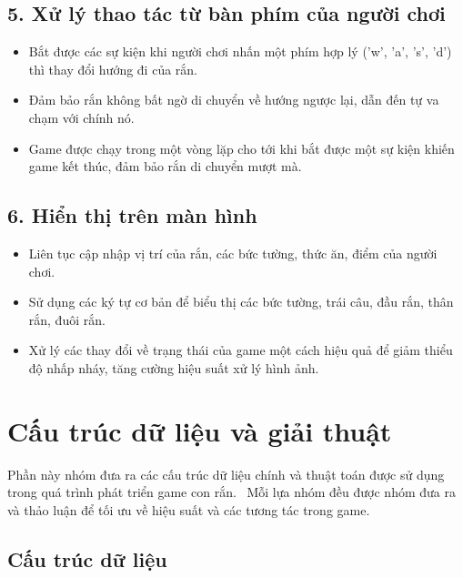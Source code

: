 \documentclass[12pt]{report}
\begin{document}
\subsection*{5. Xử lý thao tác từ bàn phím của người chơi}
\begin{itemize}
    \item Bắt được các sự kiện khi người chơi nhấn một phím hợp lý ('w', 'a', 's', 'd') thì thay đổi hướng đi của rắn.
    \item Đảm bảo rắn không bất ngờ di chuyển về hướng ngược lại, dẫn đến tự va chạm với chính nó.
    \item Game được chạy trong một vòng lặp cho tới khi bắt được một sự kiện khiến game kết thúc, đảm bảo rắn di chuyển mượt mà.
\end{itemize}

\subsection*{6. Hiển thị trên màn hình}
\begin{itemize}
    \item Liên tục cập nhập vị trí của rắn, các bức tường, thức ăn, điểm của người chơi.
    \item Sử dụng các ký tự cơ bản để biểu thị các bức tường, trái câu, đầu rắn, thân rắn, đuôi rắn.
    \item Xử lý các thay đổi về trạng thái của game một cách hiệu quả để giảm thiểu độ nhấp nháy, tăng cường hiệu suất xử lý hình ảnh.
\end{itemize}


\section*{Cấu trúc dữ liệu và giải thuật}
Phần này nhóm đưa ra các cấu trúc dữ liệu chính và thuật toán được sử dụng trong quá trình phát triển game con rắn. \
Mỗi lựa nhóm đều được nhóm đưa ra và thảo luận để tối ưu về hiệu suất và các tương tác trong game.

\subsection*{Cấu trúc dữ liệu}
\end{document}
